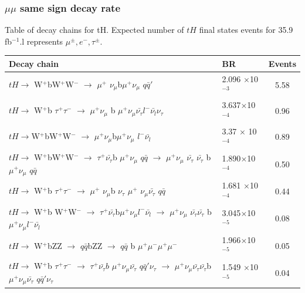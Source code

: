 \documentclass[11pt]{beamer}
\begin{document}
\begin{frame}
\frametitle{$\mu\mu$ same sign decay rate}
\tiny{Table of decay chains for tH.  Expected number of $tH$ final states events for 35.9 fb$^{-1}$.l represents $\mu^{\pm},e^- , \tau^\pm$. }
\begin{table}
\renewcommand{\arraystretch}{0.55}
\begin{tabular}{|p{8cm}|p{1.3cm}|c|}
\hline
Decay chain &BR&Events\\
\hline 
\tiny{$tH \rightarrow$ W$^+$bW$^+$W$^-$ $\rightarrow$ $\mu^+$ $\nu_\mu$b$\mu^+\nu_\mu$  $q \bar{q}'$ } &\tiny{2.096 $\times$10$^{-3}$} &  5.58  \\
\hline
\tiny{$tH \rightarrow$ W$^+$b $\tau^+ \tau^-$ $\rightarrow$ $\mu^+ \nu_\mu$ b $ \mu^+ \nu_\mu \bar{\nu_\tau} l^-\bar{\nu_l} \nu_\tau$} &\tiny{3.637$\times$10$^{-4}$}&0.96 \\
\hline
\tiny{$tH \rightarrow $W$^+$bW$^+$W$^-$ $\rightarrow$ $\mu^+\nu_\mu$b$\mu^+\nu_\mu$ $l^- \bar{\nu_l}$ } &\tiny{3.37 $\times$ 10$^{-4}$} &0.89 \\
\hline
\tiny{$tH \rightarrow$ W$^+$bW$^+$W$^-$ $\rightarrow$ $\tau^+ \bar{\nu_\tau}$b $\mu^+ \nu_\mu$  $q\bar{q}$ $\rightarrow$ $\mu^+ \nu_\mu$ $\bar{\nu_\tau}$ $\bar{\nu_\tau}$ b$\mu^+ \nu_\mu$  $q \bar{q}$} &\tiny{1.890$\times$10$^{-4}$}&0.50  \\
\hline
\tiny{$tH \rightarrow$ W$^+$b $\tau^+ \tau^-$ $\rightarrow$ $\mu^+$ $\nu_\mu$b $\nu_\tau$ $\mu^+$ $\nu_\mu \bar{\nu_\tau}$} $q \bar{q}$  &
\tiny{1.681 $\times$10$^{-4}$} & 0.44 \\
\hline
\tiny{$tH \rightarrow$ W$^+$b W$^+$W$^-$ $\rightarrow$ $\tau^+ \bar{\nu_\tau}$b$ \mu^+ \nu_\mu l^- \bar{\nu_l}$ $\rightarrow$ $\mu^+\nu_\mu$ $ \bar{\nu_\tau} \bar{\nu_\tau}$  b$ \mu^+ \nu_\mu l^- \bar{\nu_l}$} &\tiny{3.045$\times$10$^{-5}$}& 0.08\\
\hline
\tiny{$tH \rightarrow$ W$^+$bZZ $\rightarrow$ $q \bar{q}$bZZ $\rightarrow$ $q \bar{q} $ b $\mu^+ \mu^- \mu^+ \mu^-$} & \tiny{1.966$\times$10$^{-5}$} &0.05\\
\hline 
\tiny{$tH \rightarrow$ W$^+$b $\tau^+ \tau^-$ $\rightarrow$ $\tau^+ \bar{\nu_\tau}b$ $\mu^+ \nu_\mu \bar{\nu_\tau} $  $q\bar{q}' \nu_\tau$ $\rightarrow$  $\mu^+ \nu_\mu \bar{\nu_\tau}\bar{\nu_\tau} $b $\mu^+ \nu_\mu \bar{\nu_\tau} $  $q\bar{q}' \nu_\tau$ } &\tiny{1.549 $\times$10$^{-5}$} &  0.04  \\
\hline
\end{tabular}
\end{table}
\end{frame}
\end{document}
